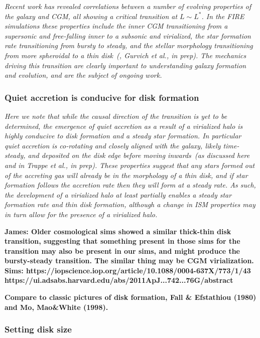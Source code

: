 \documentclass[fleqn,usenatbib]{mnras}
\begin{document}
\textit{
Recent work has revealed correlations between a number of evolving properties of the galaxy and CGM, all showing a critical transition at $L \sim L^*$.
In the FIRE simulations these properties include the inner CGM transitioning from a supersonic and free-falling inner to a subsonic and virialized, the star formation rate transitioning from bursty to steady, and the stellar morphology transitioning from more spheroidal to a thin disk~(\citealt{Stern2020, Yu2021}, Gurvich et al., in prep).
The mechanics driving this transition are clearly important to understanding galaxy formation and evolution, and are the subject of ongoing work.
}

\subsubsection{Quiet accretion is conducive for disk formation}

\textit{
Here we note that while the causal direction of the transition is yet to be determined, the emergence of quiet accretion as a result of a virialized halo is highly conducive to disk formation and a steady star formation.
In particular quiet accretion is co-rotating and closely aligned with the galaxy, likely time-steady, and deposited on the disk edge before moving inwards~(as discussed here and in Trappe et al., in prep).
These properties suggest that any stars formed out of the accreting gas will already be in the morphology of a thin disk, and if star formation follows the accretion rate then they will form at a steady rate.
As such, the development of a virialized halo at least partially enables a steady star formation rate and thin disk formation, although a change in ISM properties may in turn allow for the presence of a virialized halo.
}

\textbf{
James: Older cosmological sims showed a similar thick-thin disk transition, suggesting that something present in those sims for the transition may also be present in our sims, and might produce the bursty-steady transition.
The similar thing may be CGM virialization.
Sims: 
https://iopscience.iop.org/article/10.1088/0004-637X/773/1/43
https://ui.adsabs.harvard.edu/abs/2011ApJ...742...76G/abstract
}

\textbf{
Compare to classic pictures of disk formation, Fall \& Efstathiou (1980) and Mo, Mao\&White (1998).
}

\subsubsection{Setting disk size}
\end{document}
